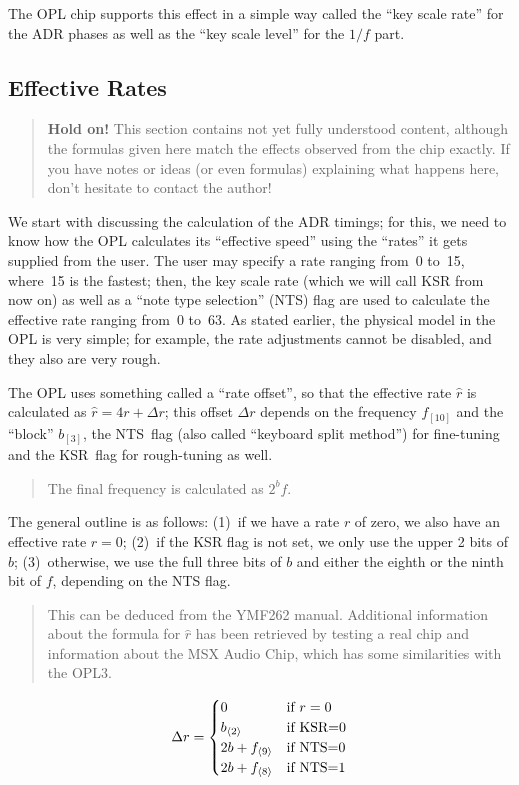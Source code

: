 \documentclass[english]{scrartcl}
\newenvironment{details}{
\par\nobreak\noindent%
\begin{quotation}%
  \footnotesize%
  \noindent\Radioactivity%
}{
\end{quotation}
}
\newcommand{\bit}[2]
	{{#1}_{\langle #2 \rangle}}
\newcommand{\bitlen}[2]
	{{#1}_{[#2]}}
\begin{document}
The OPL chip supports this effect in a simple way called the ``key scale rate'' for the ADR phases as well as the ``key scale level'' for the $1/f$ part.


\subsection{Effective Rates}
\begin{quotation}
    \textbf{Hold on!}
    This section contains not yet fully understood content, although the formulas given here match the effects observed from the chip exactly.
    If you have notes or ideas (or even formulas) explaining what happens here, don't hesitate to contact the author!
\end{quotation}
We start with discussing the calculation of the ADR timings; for this, we need to know how the OPL calculates its ``effective speed'' using the ``rates'' it gets supplied from the user.
The user may specify a rate ranging from~0 to~15, where~15 is the fastest; then, the key scale rate (which we will call KSR from now on) as well as a ``note type selection'' (NTS) flag are used to calculate the effective rate ranging from~0 to~63.
As stated earlier, the physical model in the OPL is very simple; for example, the rate adjustments cannot be disabled, and they also are very rough.

The OPL uses something called a ``rate offset'', so that the effective rate $\hat r$ is calculated as $\hat r = 4r+\Delta r$; this offset $\Delta r$ depends on the frequency $\bitlen{f}{10}$ and the ``block'' $\bitlen{b}{3}$, the NTS~flag (also called ``keyboard split method'') for fine-tuning and the KSR~flag for rough-tuning as well.
\begin{details}
    The final frequency is calculated as $2^b f$.
\end{details}

The general outline is as follows: (1)~if we have a rate $r$ of zero, we also have an effective rate $\hat r=0$; (2)~if the KSR flag is not set, we only use the upper 2 bits of $b$; (3)~otherwise, we use the full three bits of $b$ and either the eighth or the ninth bit of $f$, depending on the NTS flag.
\begin{details}
    This can be deduced from the YMF262 manual.
    Additional information about the formula for $\hat r$ has been retrieved by testing a real chip and information about the MSX Audio Chip, which has some similarities with the OPL3.
\end{details}
\[
    \Delta r = \begin{cases}
        0 & \hbox{if $r=0$} \\
        \bit{b}{2} & \hbox{if KSR=0} \\
        2b + \bit{f}{9} & \hbox{if NTS=0} \\
        2b + \bit{f}{8} & \hbox{if NTS=1}
    \end{cases}
\]
\end{document}
